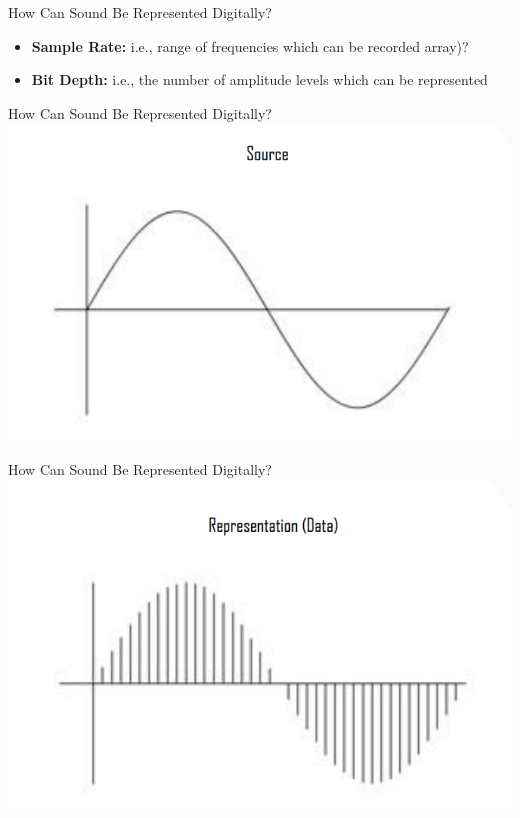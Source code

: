\begin{frame}{How Can Sound Be Represented Digitally?}
	\begin{itemize}
		\item\textbf{Sample Rate:} i.e., range of frequencies which can be recorded
		array)?

		\item\textbf{Bit Depth:} i.e., the number of amplitude levels which can be
		represented 
	\end{itemize}
\end{frame}

\begin{frame}{How Can Sound Be Represented Digitally? }
	\includegraphics[width=\linewidth,height=0.7\textheight,keepaspectratio]{source_wave}
\end{frame}

\begin{frame}{How Can Sound Be Represented Digitally? }
	\includegraphics[width=\linewidth,height=0.7\textheight,keepaspectratio]{wave_data}
\end{frame}

